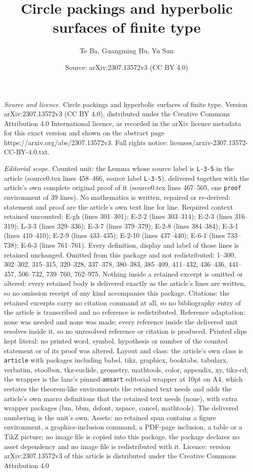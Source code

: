 \documentclass[10pt,a4paper]{amsart}
\title[Circle packings and hyperbolic surfaces of finite type]{Circle packings and hyperbolic surfaces of finite type}
\author{Te Ba, Guangming Hu, Yu Sun}
\date{Source: arXiv:2307.13572v3 (CC BY 4.0)}
\begin{document}
\maketitle

\noindent\emph{Source and licence.} Circle packings and hyperbolic surfaces of finite type. Version arXiv:2307.13572v3 (CC BY 4.0), distributed under the Creative Commons Attribution 4.0 International licence, as recorded in the arXiv licence metadata for this exact version and shown on the abstract page https://arxiv.org/abs/2307.13572v3. Full rights notice: licenses/arxiv-2307.13572-CC-BY-4.0.txt.\par\smallskip

\noindent\textit{Editorial scope.} Counted unit: the Lemma whose source label is \texttt{L-3-5} in the article (source0.tex lines 458--466, source label \texttt{L-3-5}), delivered together with the article's own complete original proof of it (source0.tex lines 467--505, one \texttt{proof} environment of 39 lines). No mathematics is written, repaired or re-derived: statement and proof are the article's own text line for line. Required context retained uncounted: E-gh (lines 301--301); E-2-2 (lines 303--314); E-2-3 (lines 316--319); L-3-3 (lines 329--336); E-3-7 (lines 379--379); E-2-8 (lines 384--384); E-3-1 (lines 410--410); E-2-9 (lines 433--435); E-2-10 (lines 437--440); E-6-1 (lines 733--738); E-6-3 (lines 761--761). Every definition, display and label of those lines is retained unchanged. Omitted from this package and not redistributed: 1--300, 302--302, 315--315, 320--328, 337--378, 380--383, 385--409, 411--432, 436--436, 441--457, 506--732, 739--760, 762--975. Nothing inside a retained excerpt is omitted or altered: every retained body is delivered exactly as the article's lines are written, so no omission receipt of any kind accompanies this package. Citations: the retained excerpts carry no citation command at all, so no bibliography entry of the article is transcribed and no reference is redistributed. Reference adaptation: none was needed and none was made; every reference inside the delivered unit resolves inside it, so no unresolved reference or citation is produced. Printed slips kept literal: no printed word, symbol, hypothesis or number of the counted statement or of its proof was altered. Layout and class: the article's own class is \texttt{article} with packages including babel, tikz, graphicx, booktabs, tabularx, verbatim, etoolbox, tkz-euclide, geometry, mathtools, color, appendix, xy, tikz-cd; the wrapper is the lane's pinned \texttt{amsart} editorial wrapper at 10pt on A4, which restates the theorem-like environments the retained text needs and adds the article's own macro definitions that the retained text needs (none), with extra wrapper packages (bm, bbm, dsfont, xspace, cancel, mathtools). The delivered numbering is the unit's own. Assets: no retained span contains a figure environment, a graphics-inclusion command, a PDF-page inclusion, a table or a TikZ picture; no image file is copied into this package, the package declares no asset dependency and no image file is redistributed with it. Licence: version arXiv:2307.13572v3 of this article is distributed under the Creative Commons Attribution 4.0 
\end{document}
